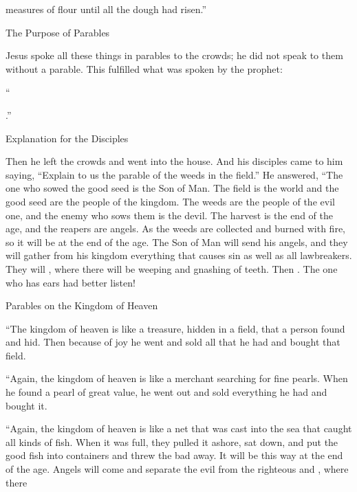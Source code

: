 {measures
of flour
until
all
the dough had risen.”
\par }{\SH The Purpose of Parables
\par }{\PP {}Jesus
spoke
all
these things
in
parables
to the crowds;
he did
not
speak
to them
without
a parable.
This
fulfilled
what was spoken
by
the prophet:
\par }{\Q “{}
\par }{.”
\par }{\SH Explanation for the Disciples
\par }{\PP {}Then
he left
the crowds
and went
into
the house.
And
his
disciples
came
to him
saying,
“Explain
to us
the parable
of the weeds
in the field.”
He
answered,
“The one who sowed
the good
seed
is
the Son
of Man.
The
field
is
the world
and
the good
seed
are
the people
of the kingdom.
The
weeds
are
the people
of the evil one,
and
the enemy
who sows
them
is
the devil.
The
harvest
is
the end
of the age,
and
the reapers
are
angels.
As
the weeds
are collected
and
burned
with fire,
so
it will be
at
the end
of the age.
The
Son
of Man
will send
his
angels,
and
they will gather
from
his
kingdom
everything
that causes sin
as well as
all lawbreakers.
They will
{}, where there
will be
weeping
and
gnashing
of teeth.
Then
{}. The one who has
ears
had better listen!
\par }{\SH Parables on the Kingdom of Heaven
\par }{\PP {}“The kingdom
of heaven
is
like
a treasure,
hidden
in
a field,
that
a person
found
and
hid.
Then because of
joy
he went
and
sold
all
that he had
and
bought
that
field.
\par }{\PP {}“Again,
the kingdom
of heaven
is
like
a merchant
searching
for fine
pearls.
When
he found
a
pearl
of great value,
he went out
and sold
everything
he had
and
bought
it.
\par }{\PP {}“Again,
the kingdom
of heaven
is
like
a net
that was cast
into
the sea
that caught
all
kinds of fish.
When
it was
full,
they pulled
it ashore,
sat down,
and put
the good
fish into
containers
and
threw
the bad
away.
It will be
this way
at
the end
of the age.
Angels
will come
and
separate
the evil
from
the righteous
and
{}, where there
}
